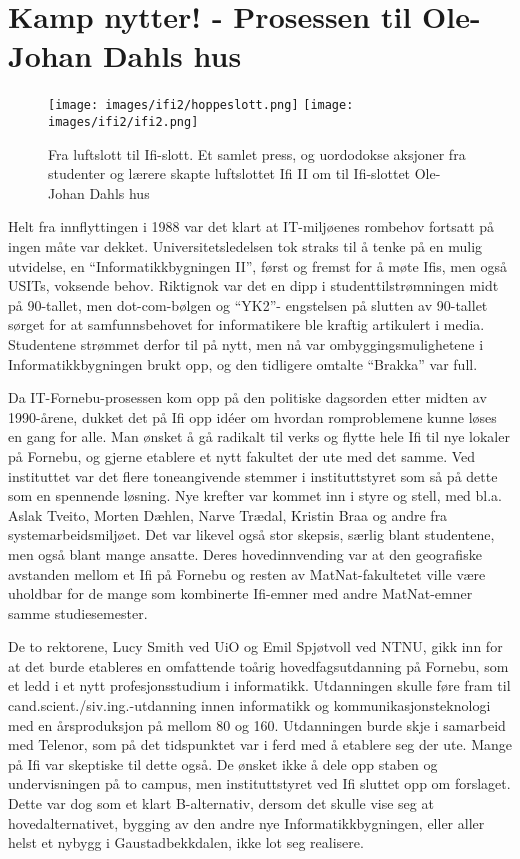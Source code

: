 \chapter[Ifi 2]{Kamp nytter! - Prosessen til Ole-Johan Dahls hus}

\label{chap:ifi2}

\author{Skrevet av Narve Trædal}

\begin{figure}
	\texttt{[image: images/ifi2/hoppeslott.png]}
	\texttt{[image: images/ifi2/ifi2.png]}
	\caption{Fra luftslott til Ifi-slott. Et samlet press, og uordodokse aksjoner fra studenter og lærere skapte luftslottet Ifi II om til Ifi-slottet Ole-Johan Dahls hus}
\end{figure}

Helt fra innflyttingen i 1988 var det klart at IT-miljøenes rombehov fortsatt på ingen måte var dekket. Universitetsledelsen tok straks til å tenke på en mulig utvidelse, en ``Informatikkbygningen II'', først og fremst for å møte Ifis, men også USITs, voksende behov. Riktignok var det en dipp i studenttilstrømningen midt på 90-tallet, men dot-com-bølgen og ``YK2''- engstelsen på slutten av 90-tallet sørget for at samfunnsbehovet for informatikere ble kraftig artikulert i media. Studentene strømmet derfor til på nytt, men nå var ombyggingsmulighetene i Informatikkbygningen brukt opp, og den tidligere omtalte ``Brakka'' var full.

Da IT-Fornebu-prosessen kom opp på den politiske dagsorden etter midten av 1990-årene, dukket det på Ifi opp idéer om hvordan romproblemene kunne løses en gang for alle. Man ønsket å gå radikalt til verks og flytte hele Ifi til nye lokaler på Fornebu, og gjerne etablere et nytt fakultet der ute med det samme. Ved instituttet var det flere toneangivende stemmer i instituttstyret som så på dette som en spennende løsning. Nye krefter var kommet inn i styre og stell, med bl.a. Aslak Tveito, Morten Dæhlen, Narve Trædal, Kristin Braa og andre fra systemarbeidsmiljøet. Det var likevel også stor skepsis, særlig blant studentene, men også blant mange ansatte. Deres hovedinnvending var at den geografiske avstanden mellom et Ifi på Fornebu og resten av MatNat-fakultetet ville være uholdbar for de mange som kombinerte Ifi-emner med andre MatNat-emner samme studiesemester.

De to rektorene, Lucy Smith ved UiO og Emil Spjøtvoll ved NTNU, gikk inn for at det burde etableres en omfattende toårig hovedfagsutdanning på Fornebu, som et ledd i et nytt profesjonsstudium i informatikk. Utdanningen skulle føre fram til cand.scient.\slash siv.ing.-utdanning innen informatikk og
kommunikasjonsteknologi med en årsproduksjon på mellom 80 og 160. Utdanningen burde skje i samarbeid med Telenor, som på det tidspunktet var i ferd med å etablere seg der ute. Mange på Ifi var skeptiske til dette også. De ønsket ikke å dele opp staben og undervisningen på to campus, men instituttstyret ved Ifi sluttet opp om forslaget. Dette var dog som et klart B-alternativ, dersom det skulle vise seg at hovedalternativet, bygging av den andre nye Informatikkbygningen, eller aller helst et nybygg i Gaustadbekkdalen, ikke lot seg realisere.

